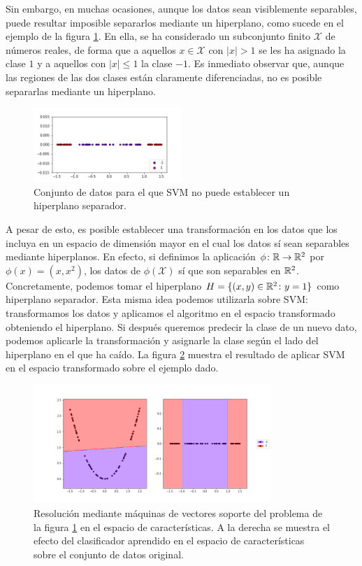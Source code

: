 Sin embargo, en muchas ocasiones, aunque los datos sean visiblemente separables, puede resultar imposible separarlos mediante un hiperplano, como sucede en el ejemplo de la figura \ref{fig:svm_ejemplo2}. En ella, se ha considerado un subconjunto finito $\mathcal{X}$ de números reales, de forma que a aquellos $x \in \mathcal{X}$ con $|x| > 1$ se les ha asignado la clase $1$ y a aquellos con $|x| \le 1$ la clase $-1$. Es inmediato observar que, aunque las regiones de las dos clases están claramente diferenciadas, no es posible separarlas mediante un hiperplano.

\begin{figure}[h]
    \centering
    \includegraphics[width=0.5\textwidth]{images/svm_problem.png}
    \caption{Conjunto de datos para el que SVM no puede establecer un hiperplano separador.} \label{fig:svm_ejemplo2}
\end{figure} 

A pesar de esto, es posible establecer una transformación en los datos que los incluya en un espacio de dimensión mayor en el cual los datos sí sean separables mediante hiperplanos. En efecto, si definimos la aplicación $\phi\colon \mathbb{R} \to \mathbb{R}^2$ por $\phi(x) = (x,x^2)$, los datos de $\phi(\mathcal{X})$ sí que son separables en $\mathbb{R}^2$. Concretamente, podemos tomar el hiperplano $H = \{(x,y) \in \mathbb{R}^2 \colon y = 1\}$ como hiperplano separador. Esta misma idea podemos utilizarla sobre SVM: transformamos los datos y aplicamos el algoritmo en el espacio transformado obteniendo el hiperplano. Si después queremos predecir la clase de un nuevo dato, podemos aplicarle la transformación y asignarle la clase según el lado del hiperplano en el que ha caído. La figura \ref{fig:svm_ejemplo3} muestra el resultado de aplicar SVM en el espacio transformado sobre el ejemplo dado.

\begin{figure}[h]
    \includegraphics[width=0.8\textwidth]{images/svm_solution.png}
    \centering
    \caption{Resolución mediante máquinas de vectores soporte del problema de la figura \ref{fig:svm_ejemplo2} en el espacio de características. A la derecha se muestra el efecto del clasificador aprendido en el espacio de características sobre el conjunto de datos original.} \label{fig:svm_ejemplo3}
\end{figure} 

